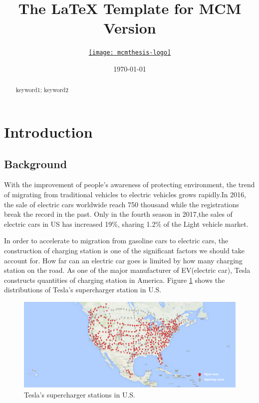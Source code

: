 \documentclass{mcmthesis}
\title{The \LaTeX{} Template for MCM Version \MCMversion}
\author{\small \href{http://www.latexstudio.net/}
  {\texttt{[image: mcmthesis-logo]}}}
\date{\today}
\begin{document}
\begin{abstract}

\lipsum[1]
\begin{keywords}
keyword1; keyword2
\end{keywords}
\end{abstract}
\maketitle
\tableofcontents \newpage
\section{Introduction}
\subsection{Background}

With the improvement of people's awareness of protecting environment, the trend of migrating from traditional vehicles to electric
vehicles grows rapidly.In 2016, the sale of electric cars worldwide reach 750 thousand while the registrations break the record in
the past. Only in the fourth season in 2017,the sales of electric cars in US has increased 19\%, sharing 1.2\% of the Light vehicle
market.

In order to accelerate to migration from gasoline cars to electric cars, the construction of charging station is one of the significant
factors we should take account for. How far can an electric car goes is limited by how many charging station on the road. As one of
the major manufacturer of EV(electric car), Tesla constructs quantities of charging station in America. Figure \ref{fig:f1} shows
the distributions of Tesla's supercharger station in U.S.

\begin{figure}[h]
\centering
\includegraphics[width=15cm]{1.png}
\caption{Tesla's supercharger stations in U.S.} \label{fig:f1}
\end{figure}
\end{document}
